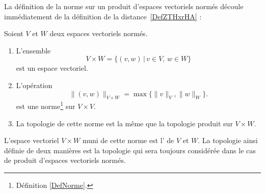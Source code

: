 La définition de la norme sur un produit d'espaces vectoriels normés découle immédiatement de la définition de la distance~\ref{DefZTHxrHA} :
\begin{lemmaDef}  \label{DefFAJgTCE}
    Soient $V$ et $W$ deux espaces vectoriels normés. 
    \begin{enumerate}
        \item
            L'ensemble
            \begin{equation}
            V\times W=\{(v,w)\,|\, v\in V,\, w\in W\}
            \end{equation}
            est un espace vectoriel.
        \item 
            L'opération
            \begin{equation}	\label{EqNormeVxWmax}
                \|(v,w) \|_{V\times W}=\max\{\|v\|_{V},\|w\|_W\}.
            \end{equation}
            est une norme\footnote{Définition \ref{DefNorme}.} sur \( V\times V\).
        \item
            La topologie de cette norme est la même que la topologie produit sur \( V\times W\).
    \end{enumerate}
    L'espace vectoriel \( V\times W\) muni de cette norme est l' de $V$ et $W$. La topologie ainsi définie de deux manières est la topologie qui sera toujours considérée dans le cas de produit d'espaces vectoriels normés.
\end{lemmaDef}

